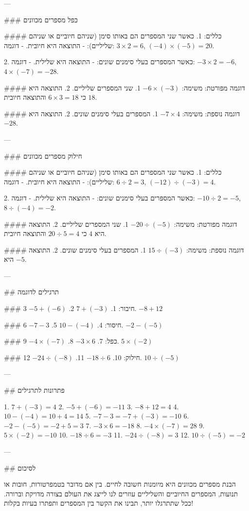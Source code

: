 ---

### כפל מספרים מכוונים

#### כללים:
1. כאשר שני המספרים הם באותו סימן (שניהם חיוביים או שניהם שליליים):
   - התוצאה היא חיובית.
   - דוגמה: $3 \times 2 = 6$, $(-4) \times (-5) = 20$.

2. כאשר המספרים בעלי סימנים שונים:
   - התוצאה היא שלילית.
   - דוגמה: $-3 \times 2 = -6$, $4 \times (-7) = -28$.

#### דוגמה מפורטת:
משימה: $-6 \times (-3)$
1. שני המספרים שליליים.
2. התוצאה היא $18$ כי $6 \times 3 = 18$ והתוצאה חיובית.

#### דוגמה נוספת:
משימה: $-7 \times 4$
1. המספרים בעלי סימנים שונים.
2. התוצאה היא $-28$.

---

### חילוק מספרים מכוונים

#### כללים:
1. כאשר שני המספרים הם באותו סימן (שניהם חיוביים או שניהם שליליים):
   - התוצאה היא חיובית.
   - דוגמה: $6 \div 2 = 3$, $(-12) \div (-3) = 4$.

2. כאשר המספרים בעלי סימנים שונים:
   - התוצאה היא שלילית.
   - דוגמה: $-10 \div 2 = -5$, $8 \div (-4) = -2$.

#### דוגמה מפורטת:
משימה: $-20 \div (-5)$
1. שני המספרים שליליים.
2. התוצאה היא $4$ כי $20 \div 5 = 4$ והתוצאה חיובית.

#### דוגמה נוספת:
משימה: $15 \div (-3)$
1. המספרים בעלי סימנים שונים.
2. התוצאה היא $-5$.

---

## תרגילים לדוגמה

### חיבור:
1. $7 + (-3)$
2. $-5 + (-6)$
3. $-8 + 12$

### חיסור:
4. $10 - (-4)$
5. $-7 - 3$
6. $-2 - (-5)$

### כפל:
7. $-3 \times 6$
8. $-4 \times (-7)$
9. $5 \times (-2)$

### חילוק:
10. $-18 \div 6$
11. $-24 \div (-8)$
12. $10 \div (-5)$

---

## פתרונות לתרגילים

1. $7 + (-3) = 4$
2. $-5 + (-6) = -11$
3. $-8 + 12 = 4$
4. $10 - (-4) = 10 + 4 = 14$
5. $-7 - 3 = -7 + (-3) = -10$
6. $-2 - (-5) = -2 + 5 = 3$
7. $-3 \times 6 = -18$
8. $-4 \times (-7) = 28$
9. $5 \times (-2) = -10$
10. $-18 \div 6 = -3$
11. $-24 \div (-8) = 3$
12. $10 \div (-5) = -2$

---

## לסיכום

הבנת מספרים מכוונים היא מיומנות חשובה לחיים. בין אם מדובר בטמפרטורות, חובות או תנועות, המספרים החיוביים והשליליים עוזרים לנו לייצג את העולם בצורה מדויקת וברורה. ככל שתתרגלו יותר, תבינו את הקשר בין המספרים ותפתרו בעיות בקלות!
